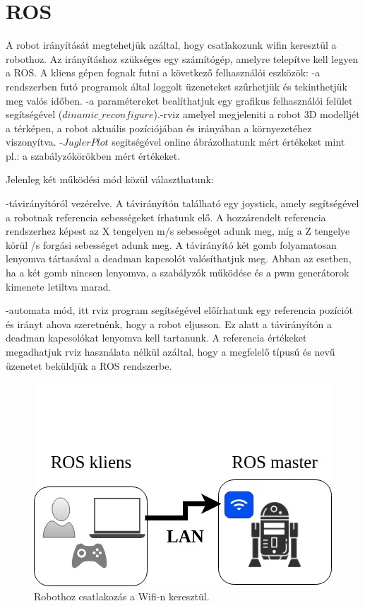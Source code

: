 \section{ROS}

A robot irányítását megtehetjük azáltal, hogy csatlakozunk wifin keresztül a robothoz. Az irányításhoz szükséges egy számítógép, amelyre telepítve kell  legyen a ROS. A kliens gépen fognak futni a következő felhasználói eszközök:
-a rendszerben futó programok által loggolt üzeneteket szűrhetjük és tekinthetjük meg valós időben.
-a paramétereket bealíthatjuk egy grafikus felhasználói felület segítségével ($dinamic\_reconfigure$).-rviz amelyel megjeleniti a robot 3D modelljét a térképen, a robot aktuális pozíciójában és irányában a környezetéhez viszonyítva.
-$JuglerPlot$ segitségével online ábrázolhatunk mért értékeket mint pl.: a szabályzókörökben mért értékeket.

Jelenleg két működési mód közül választhatunk:

	-távirányítóról vezérelve. A távirányítón található egy joystick, amely segítségével a robotnak referencia sebességeket írhatunk elő. A hozzárendelt referencia rendszerhez képest az X tengelyen m/s sebességet adunk meg, míg a Z tengelye körül \degree/s forgási sebességet adunk meg.
A távirányító két gomb folyamatosan lenyomva tártasával a deadman kapcsolót valósíthatjuk meg. Abban az esetben, ha a két gomb nincsen lenyomva, a szabályzók működése és a pwm generátorok kimenete letiltva marad.

	-automata mód, itt rviz program segítségével előírhatunk egy referencia pozíciót és irányt ahova szeretnénk, hogy a robot eljusson. Ez alatt a távirányítón a deadman kapcsolókat lenyomva kell tartanunk. A referencia értékeket megadhatjuk rviz használata nélkül azáltal, hogy a megfelelő típusú és nevű üzenetet beküldjük a ROS rendszerbe.



\begin{figure}[H]
  \includegraphics{tikz/RobotUserLan.jpg}
  \caption{Robothoz csatlakozás a Wifi-n keresztül.}
  \label{fig:RobotUserLan}
\end{figure}


